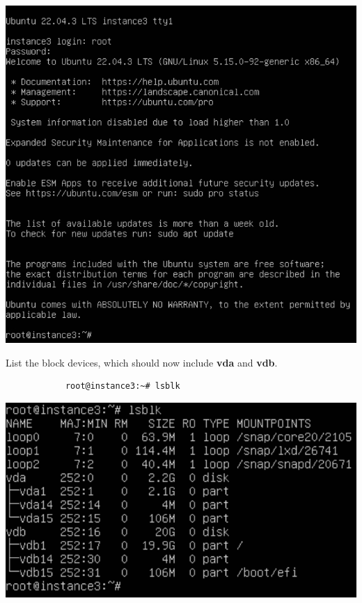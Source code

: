 \documentclass[letterpaper, 12pt]{article}
\begin{document}
\begin{enumerate}
\begin{labstep}
        \begin{center}
            \includegraphics[width=\linewidth]{images/part8/step9.png}
        \end{center}
    \end{labstep}

    \begin{labstep}
        List the block devices, which should now include \textbf{vda} and \textbf{vdb}.
        \begin{lstlisting}
            root@instance3:~# lsblk
        \end{lstlisting}

        \begin{center}
            \includegraphics[width=\linewidth]{images/part8/step10.png}
        \end{center}
    \end{labstep}


\end{enumerate}
\end{document}
